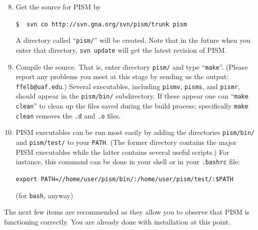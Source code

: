 \documentclass[12pt,final]{amsart}
\renewcommand{\t}[1]{\texttt{#1}}
\begin{document}
\begin{enumerate}\setcounter{enumi}{7}
\item \label{getPISMstep} Get the source for PISM by

\verb|$  svn co http://svn.gna.org/svn/pism/trunk pism|

\noindent A directory called ``\verb|pism/|'' will be created.  Note that in the future when you enter that directory, \verb|svn update| will get the latest revision of PISM.

\item Compile the source.  That is, enter directory \verb|pism/| and type ``\verb|make|''.  (Please report any problems you meet at this stage by sending us the output: \verb|ffelb@uaf.edu|.)  Several executables, including \verb|pismv|, \verb|pisms|, and \verb|pismr|, should appear in the \verb|pism/bin/| subdirectory.  If these appear one can ``\verb|make clean|'' to clean up the files saved during the build process; specifically \verb|make clean| removes the \t{.d} and \t{.o} files.

\item PISM executables can be run most easily by adding the directories \verb|pism/bin/| and \verb|pism/test/| to your \verb|PATH|.  (The former directory contains the major PISM executables while the latter contains several useful scripts.)  For instance, this command can be done in your shell or in your \verb|.bashrc| file:

\verb|export PATH=//home/user/pism/bin/:/home/user/pism/test/:$PATH|

\noindent(for \verb|bash|, anyway)
\end{enumerate}

\bigskip
The next few items are recommended as they allow you to observe that PISM is functioning correctly.  You are already done with installation at this point.
\bigskip
\end{document}
